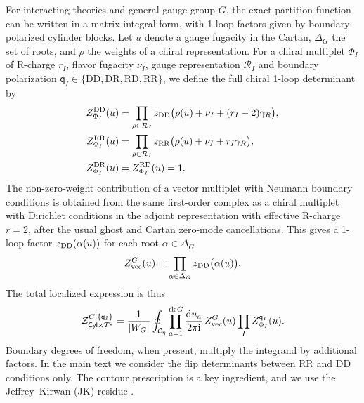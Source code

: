 \documentclass[11pt,a4paper]{article}
\numberwithin{equation}{section}
\theoremstyle{plain}
\theoremstyle{definition}
\theoremstyle{remark}
\newcommand{\ii}{\mathrm{i}}
\newcommand{\dd}{\mathrm{d}}
\newcommand{\nn}{\nonumber}
\newcommand{\cyl}{\mathsf{Cyl}}
\begin{document}
For interacting theories and general gauge group \(G\), the exact partition function can be written in a matrix-integral form, with 1-loop factors given  by boundary-polarized cylinder blocks.  Let \(u\) denote a gauge fugacity in the Cartan, \(\Delta_G\) the set of roots, and \(\rho\) the weights of a chiral representation.  For a chiral multiplet \(\Phi_I\) of R-charge \(r_I\), flavor fugacity \(\nu_I\), gauge representation \(\mathcal R_I\) and boundary polarization \(\mathsf q_I\in\{\mathrm{DD},\mathrm{DR},\mathrm{RD},\mathrm{RR}\}\), we define the full chiral 1-loop determinant by
\begin{align}
Z_{\Phi_I}^{\mathrm{DD}}(u)
&=
\prod_{\rho\in\mathcal R_I}
z_{\rm DD}\big(\rho(u)+\nu_I+(r_I-2)\gamma_R\big),
\nn\\
Z_{\Phi_I}^{\mathrm{RR}}(u)
&=
\prod_{\rho\in\mathcal R_I}
z_{\rm RR}\big(\rho(u)+\nu_I+r_I\gamma_R\big),
\nn\\
Z_{\Phi_I}^{\mathrm{DR}}(u)&=Z_{\Phi_I}^{\mathrm{RD}}(u)=1 .
\label{eq:intro-general-chiral-factors}
\end{align}
The non-zero-weight contribution of a vector multiplet with Neumann boundary conditions is obtained from the same first-order complex as a chiral multiplet with Dirichlet conditions in the adjoint representation with effective R-charge \(r=2\), after the usual ghost and Cartan zero-mode cancellations. This gives a 1-loop factor \(z_{\rm DD}(\alpha(u))\) for each root \(\alpha\in\Delta_G\)
\begin{equation}
Z_{\rm vec}^{G}(u)=\prod_{\alpha\in\Delta_G}z_{\rm DD}\big(\alpha(u)\big).
\label{eq:intro-general-vector-factor}
\end{equation}
The total localized expression is thus
\begin{equation}
\mathcal Z_{\cyl\times T^2}^{G,\{\mathsf q_I\}}
=
\frac{1}{|W_G|}
\oint_{\mathcal C_\eta}
\prod_{a=1}^{\operatorname{rk}G}\frac{\dd u_a}{2\pi\ii}\,
Z_{\rm vec}^{G}(u)
\prod_I Z_{\Phi_I}^{\mathsf q_I}(u).
\label{eq:intro-general-gauge-partition}
\end{equation}
Boundary degrees of freedom, when present, multiply the integrand by additional factors. In the main text we consider the flip determinants between RR and DD conditions only. The contour prescription is a key ingredient, and  we use the Jeffrey--Kirwan (JK) residue \cite{Nekrasov:2009uh,JeffreyKirwan1995,Benini:2013xpa,Benini:2013nda,Closset:2017zgf}.
\end{document}
